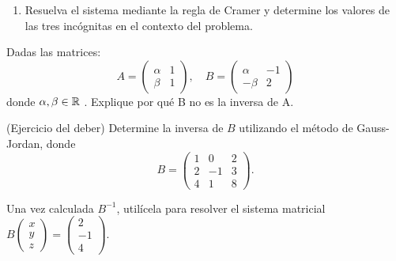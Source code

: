 \documentclass[10pt,a4]{examenEPN0}
\begin{document}
\begin{preguntas}
\begin{enumerate}
\item Resuelva el sistema mediante la regla de Cramer y determine los valores de las tres incógnitas
en el contexto del problema. 
\end{enumerate}
\newpage
\item Dadas las matrices: 
    \[A = \left(\begin{array}{cc}
         \alpha &1  \\
         \beta& 1 
    \end{array}\right),\quad B = \left(\begin{array}{cc}
         \alpha &-1  \\
         -\beta& 2 
    \end{array}\right)\]
    donde \(\alpha,\beta\in\mathbb{R}\) . Explique por qué B no es la inversa de A.


\newpage
\item (Ejercicio del deber)    Determine la inversa de $B$ utilizando el método de Gauss-Jordan, donde 
$$B=\begin{pmatrix}1&0&2\\2&-1&3\\4&1&8\end{pmatrix}.$$

Una vez calculada $B^{-1}$, utilícela para resolver el sistema matricial $B\begin{pmatrix}x\\y\\z\end{pmatrix} = \begin{pmatrix}2\\-1\\4\end{pmatrix}.$


    
\end{preguntas}
\final
\end{document}
